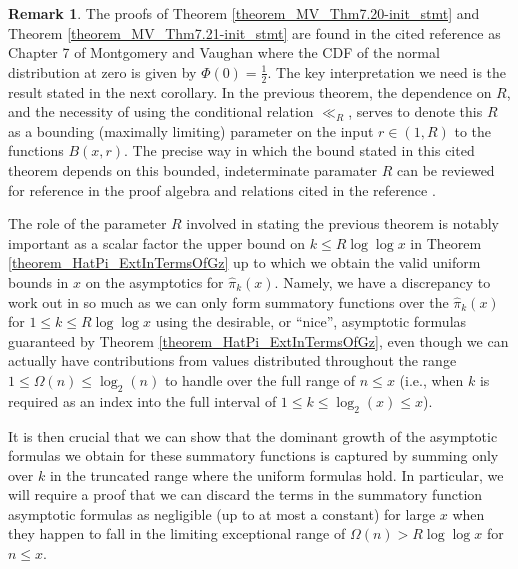 \documentclass[11pt,reqno,a4letter]{article}
\numberwithin{figure}{section}
\numberwithin{table}{section}
\theoremstyle{plain}
\numberwithin{theorem}{section}
\theoremstyle{definition}
\newtheorem{remark}[theorem]{Remark}
\begin{document}
\begin{remark} 
The proofs of Theorem \ref{theorem_MV_Thm7.20-init_stmt} and 
Theorem \ref{theorem_MV_Thm7.21-init_stmt} 
are found in the cited reference as Chapter 7 of Montgomery and Vaughan where the 
CDF of the normal distribution at zero is given by $\Phi(0) = \frac{1}{2}$. 
The key interpretation we need is the result stated in the next corollary. 
In the previous theorem, the dependence on $R$, and the necessity of using the 
conditional relation $\ll_R$, serves to denote this $R$ as a 
bounding (maximally limiting) parameter on the 
input $r \in (1, R)$ to the functions $B(x, r)$. 
The precise way in which the bound 
stated in this cited theorem depends on this bounded, 
indeterminate paramater $R$ can be reviewed for reference in the proof 
algebra and relations cited in the reference \cite[\S 7]{MV}. 

The role of the parameter $R$ involved in stating the previous theorem 
is notably important as a scalar factor the upper bound on $k \leq R\log\log x$ in 
Theorem \ref{theorem_HatPi_ExtInTermsOfGz} up to which 
we obtain the valid uniform bounds in $x$ on the asymptotics for 
$\widehat{\pi}_k(x)$. 
Namely, we have a discrepancy to work out in so much as we 
can only form summatory functions over the $\widehat{\pi}_k(x)$ for 
$1 \leq k \leq R\log\log x$ using the desirable, or ``nice'', asymptotic formulas
guaranteed by Theorem \ref{theorem_HatPi_ExtInTermsOfGz}, even though we can actually 
have contributions from values distributed throughout the range $1 \leq \Omega(n) \leq \log_2(n)$ 
to handle over the full range of $n \leq x$ (i.e., when $k$ is required as an index 
into the full interval of $1 \leq k \leq \log_2(x) \leq x$). 

It is then crucial that we can show that the dominant growth of the asymptotic formulas we obtain 
for these summatory functions is captured by summing only over $k$ in the truncated range 
where the uniform formulas hold. In particular, we will require a proof 
that we can discard the terms in the summatory function 
asymptotic formulas as negligible (up to at most a constant) 
for large $x$ when they happen to fall in the 
limiting exceptional range of $\Omega(n) > R\log\log x$ for $n \leq x$. 
\end{remark} 
\end{document}
